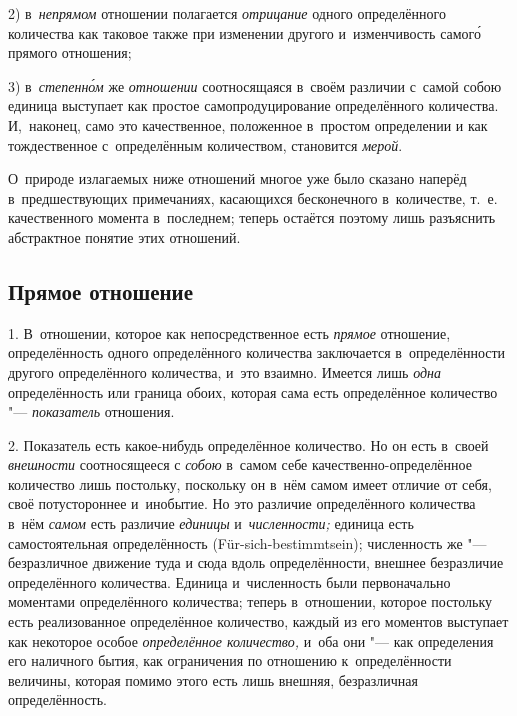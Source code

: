 2) в~{\em непрямом} отношении полагается {\em отрицание} одного определённого
количества как таковое также при изменении другого и~изменчивость самог\'{о}
прямого отношения;

3) в~{\em степенн\'{о}м} же {\em отношении} соотносящаяся в~своём различии
с~самой собою единица выступает как простое самопродуцирование определённого
количества. И,~наконец, само это качественное, положенное в~простом определении
и как тождественное с~определённым количеством, становится {\em мерой}.

О~природе излагаемых ниже отношений многое уже было сказано наперёд
в~предшествующих примечаниях, касающихся бесконечного в~количестве, т.~е.
качественного момента в~последнем; теперь остаётся поэтому лишь разъяснить
абстрактное понятие этих отношений.

\subsection{Прямое отношение}

1. В~отношении, которое как непосредственное есть {\em прямое} отношение,
определённость одного определённого количества заключается в~определённости
другого определённого количества, и~это взаимно. Имеется лишь {\em одна}
определённость или граница обоих, которая сама есть определённое количество
"--- {\em показатель} отношения.

2. Показатель есть какое-нибудь определённое количество. Но он есть в~своей
{\em внешности} соотносящееся с {\em собою} в~самом себе
качественно-определённое количество лишь постольку, поскольку он в~нём самом
имеет отличие от себя, своё потустороннее и~инобытие. Но это различие
определённого количества в~нём {\em самом} есть различие {\em единицы}
и~{\em численности;} единица есть самостоятельная определённость
(Für-sich-bestimmt\-sein); численность же "--- безразличное движение туда и
сюда вдоль определённости, внешнее безразличие определённого количества.
Единица и~численность были первоначально моментами определённого количества;
теперь в~отношении, которое постольку есть реализованное определённое
количество, каждый из его моментов выступает как некоторое особое
{\em определённое количество,} и~оба они "--- как определения его наличного
бытия, как ограничения по отношению к~определённости величины, которая помимо
этого есть лишь внешняя, безразличная определённость.

